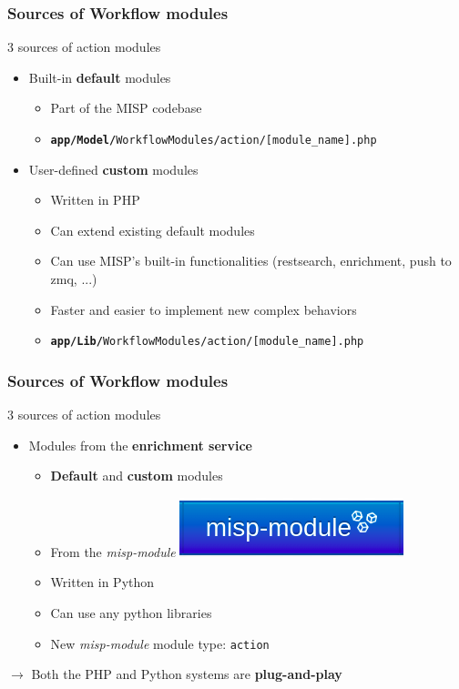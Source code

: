\begin{frame}
    \frametitle{Sources of Workflow modules}
    3 sources of action modules
    \begin{itemize}
        \item Built-in \textbf{default} modules
        \begin{itemize}
            \item Part of the MISP codebase
            \item \texttt{\scriptsize \textbf{app/Model/}WorkflowModules/action/[module\_name].php}
        \end{itemize}
        \item User-defined \textbf{custom} modules
        \begin{itemize}
            \item Written in PHP
            \item Can extend existing default modules
            \item Can use MISP's built-in functionalities (restsearch, enrichment, push to zmq, ...)
            \item Faster and easier to implement new complex behaviors
            \item \texttt{\scriptsize \textbf{app/Lib/}WorkflowModules/action/[module\_name].php}
        \end{itemize}
    \end{itemize}
\end{frame}

\begin{frame}
    \frametitle{Sources of Workflow modules}
    3 sources of action modules
    \begin{itemize}
        \item Modules from the \textbf{enrichment service}
        \begin{itemize}
            \item \textbf{Default} and \textbf{custom} modules
            \item From the \textit{misp-module} \includegraphics[width=0.25\linewidth]{pictures/misp-module-icon.png}
            \item Written in Python
            \item Can use any python libraries
            \item New \textit{misp-module} module type: \texttt{action}
        \end{itemize}
    \end{itemize}
    \vspace{1em}
    \begin{center}
        $\rightarrow$ Both the PHP and Python systems are \textbf{plug-and-play}
    \end{center}
\end{frame}

